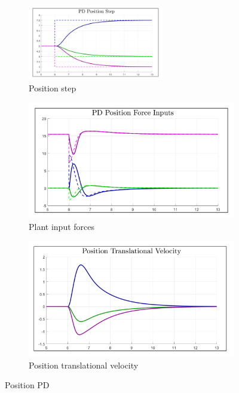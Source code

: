 \begin{figure}[htbp]
\centering
\begin{subfigure}{\textwidth}
\centering
\includegraphics[width=0.65\textwidth]{graphs/PD_Position_Step}
\caption{Position step}
\label{fig:PD_Position_Step}
\end{subfigure}
\begin{subfigure}{0.49\textwidth}
\centering
\includegraphics[width=\textwidth]{graphs/PD_Position_Force}
\caption{Plant input forces}
\label{fig:PD_Position_Force}
\end{subfigure}
\begin{subfigure}{0.49\textwidth}
\centering
\includegraphics[width=\textwidth]{graphs/PD_Position_Velocity}
\caption{Position translational velocity}
\label{fig:PD_Position_Velocity}
\end{subfigure}
\caption{Position PD}
\end{figure}
\newpage

